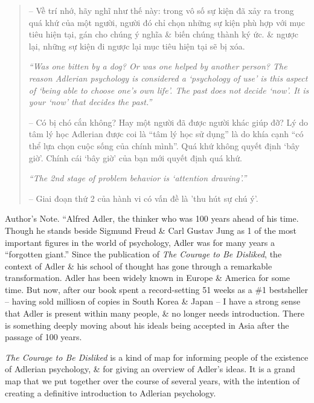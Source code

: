 \documentclass{article}
\begin{document}
\begin{enumerate}
\begin{quotation}
		-- Về trí nhớ, hãy nghĩ như thế này: trong vô số sự kiện đã xảy ra trong quá khứ của một người, người đó chỉ chọn những sự kiện phù hợp với mục tiêu hiện tại, gán cho chúng ý nghĩa \& biến chúng thành ký ức. \& ngược lại, những sự kiện đi ngược lại mục tiêu hiện tại sẽ bị xóa.
		
		{\it``Was one bitten by a dog? Or was one helped by another person? The reason Adlerian psychology is considered a `psychology of use' is this aspect of `being able to choose one's own life'. The past does not decide `now'. It is your `now' that decides the past.''}
		
		-- Có bị chó cắn không? Hay một người đã được người khác giúp đỡ? Lý do tâm lý học Adlerian được coi là ``tâm lý học sử dụng'' là do khía cạnh ``có thể lựa chọn cuộc sống của chính mình''. Quá khứ không quyết định ‘bây giờ'. Chính cái ‘bây giờ' của bạn mới quyết định quá khứ.
		
		{\it``The 2nd stage of problem behavior is `attention drawing'.''}
		
		-- Giai đoạn thứ 2 của hành vi có vấn đề là 'thu hút sự chú ý'.
	\end{quotation}
	{\sf Author's Note.}  ``{\sc Alfred Adler}, the thinker who was 100 years ahead of his time. Though he stands beside {\sf Sigmund Freud} \& {\sc Carl Gustav Jung} as 1 of the most important figures in the world of psychology, {\sc Adler} was for many years a ``forgotten giant.'' Since the publication of {\it The Courage to Be Disliked}, the context of {\sc Adler} \& his school of thought has gone through a remarkable transformation. {\sc Adler} has been widely known in Europe \& America for some time. But now, after our book spent a record-setting 51 weeks as a \#1 bestsheller -- having sold milliosn of copies in South Korea \& Japan -- I have a strong sense that {\sc Adler} is present within many people, \& no longer needs introduction. There is something deeply moving about his ideals being accepted in Asia after the passage of 100 years.
	
	{\it The Courage to Be Disliked} is a kind of map for informing people of the existence of Adlerian psychology, \& for giving an overview of {\sc Adler}'s ideas. It is a grand map that we put together over the course of several years, with the intention of creating a definitive introduction to Adlerian psychology.
	

\end{enumerate}
\end{document}
